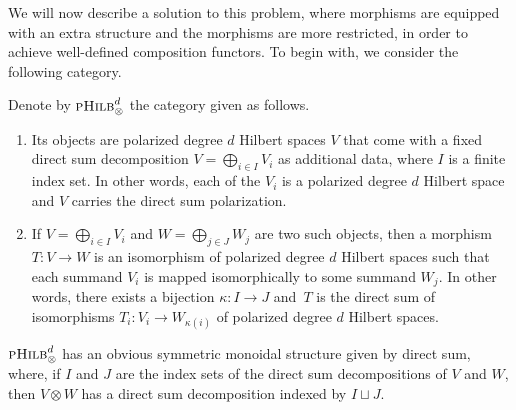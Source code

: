 \documentclass[10pt,a4paper]{amsart}
\numberwithin{equation}{section}
\newcommand{\pHilb}{\textsc{pHilb}}
\begin{document}
We will now describe a solution to this problem, where morphisms are equipped with an extra structure and the morphisms are more restricted, in order to achieve well-defined composition functors.
To begin with, we consider the following category.

\begin{Definition}
Denote by $\pHilb^d_\otimes$ the category given as follows.
\begin{enumerate}\itemsep=0pt
\item[(1)]
Its objects are polarized degree $d$ Hilbert spaces $V$ that come with a fixed direct sum decomposition $V = \bigoplus_{i \in I} V_i$ as additional data, where $I$ is a finite index set.
In other words, each of the $V_i$ is a polarized degree $d$ Hilbert space and $V$ carries the direct sum polarization.
\item[(2)]
If $V = \bigoplus_{i \in I} V_i$ and $W = \bigoplus_{j \in J} W_j$ are two such objects, then a morphism $T\colon V \to W$ is an isomorphism of polarized degree $d$ Hilbert spaces such that each summand $V_i$ is mapped isomorphically to some summand $W_j$.
In other words, there exists a bijection $\kappa\colon I \to J$ and~$T$ is the direct sum of isomorphisms $T_i \colon V_i \to W_{\kappa(i)}$ of polarized degree $d$ Hilbert spaces.
\end{enumerate}
$\pHilb^d_\otimes$ has an obvious symmetric monoidal structure given by direct sum, where, if $I$ and $J$ are the index sets of the direct sum decompositions of $V$ and $W$, then $V \otimes W$ has a direct sum decomposition indexed by $I \sqcup J$.
\end{Definition}
\end{document}
